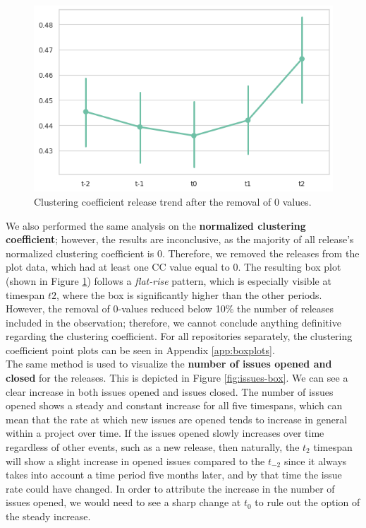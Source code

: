 \begin{figure}[!htbp]
    \centering
    \includegraphics[width=\textwidth]{figures/quantitative/pointplots/clustering_coeff_filtered.png}
    \caption{Clustering coefficient release trend after the removal of 0 values.}
    \label{fig:clustering-box}
\end{figure}

We also performed the same analysis on the \textbf{normalized clustering coefficient}; however, the results are inconclusive, as the majority of all release's normalized clustering coefficient is $0$. Therefore, we removed the releases from the plot data, which had at least one CC value equal to $0$. The resulting box plot (shown in Figure \ref{fig:clustering-box}) follows a \textit{flat-rise} pattern, which is especially visible at timespan $t2$, where the box is significantly higher than the other periods. However, the removal of 0-values reduced below 10\% the number of releases included in the observation; therefore, we cannot conclude anything definitive regarding the clustering coefficient. For all repositories separately, the clustering coefficient point plots can be seen in Appendix \ref{app:boxplots}. \\

The same method is used to visualize the \textbf{number of issues opened and closed} for the releases. This is depicted in Figure \ref{fig:issues-box}. We can see a clear increase in both issues opened and issues closed. The number of issues opened shows a steady and constant increase for all five timespans, which can mean that the rate at which new issues are opened tends to increase in general within a project over time. If the issues opened slowly increases over time regardless of other events, such as a new release, then naturally, the $t_2$ timespan will show a slight increase in opened issues compared to the $t_{-2}$ since it always takes into account a time period five months later, and by that time the issue rate could have changed. In order to attribute the increase in the number of issues opened, we would need to see a sharp change at $t_0$ to rule out the option of the steady increase.

